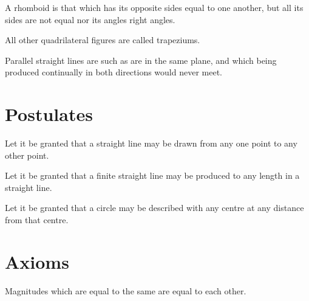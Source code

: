 \documentclass[booklanguage=english]{byrnebook}
\begin{document}
\startdefinition{}\label{def:I.XXXIII}
\begin{center}
\drawCurrentPictureInMargin[inside] A rhomboid is that which has its opposite sides equal to one another, but all its sides are not equal nor its angles right angles.
\end{center}

\startdefinition{}\label{def:I.XXXIV}
\begin{center}
All other quadrilateral figures are called trapeziums.
\end{center}

\startdefinition{}\label{def:I.XXXV}
\begin{center}
\drawCurrentPictureInMargin[inside] Parallel straight lines are such as are in the same plane, and which being produced continually in both directions would never meet.
\end{center}

\chapter*{Postulates}

\startpostulate{}\label{post:I.I}
Let it be granted that a straight line may be drawn from any one point to any other point.

\startpostulate{}\label{post:I.II}
Let it be granted that a finite straight line may be produced to any length in a straight line.

\startpostulate{}\label{post:I.III}
Let it be granted that a circle may be described with any centre at any distance from that centre.

\chapter*{Axioms}

\startaxiom{}\label{ax:I.I}
Magnitudes which are equal to the same are equal to each other.
\end{document}
